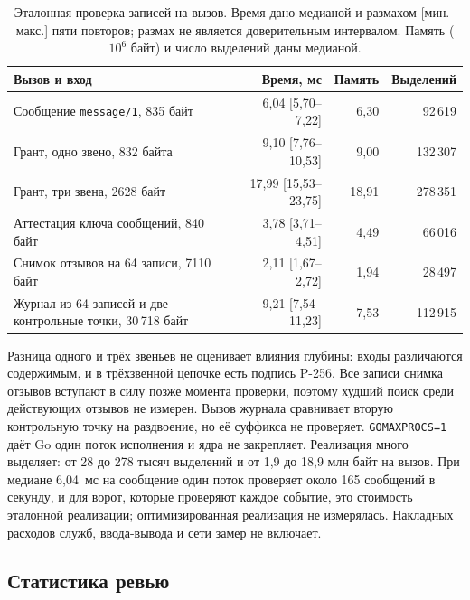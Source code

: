 \documentclass[10pt,a4paper]{article}
\begin{document}
\begin{table}[t]
\centering\small
\caption{Эталонная проверка записей на вызов. Время дано медианой и размахом [мин.--макс.] пяти повторов; размах не является доверительным интервалом. Память ($10^6$ байт) и число выделений даны медианой.}
\label{tab:bench}
\begin{tabular}{L{7.6cm}rrr}
\toprule
Вызов и вход & Время, мс & Память & Выделений \\
\midrule
Сообщение \texttt{message/1}, 835 байт & 6,04 [5,70--7,22] & 6,30 & 92\,619 \\
Грант, одно звено, 832 байта & 9,10 [7,76--10,53] & 9,00 & 132\,307 \\
Грант, три звена, 2628 байт & 17,99 [15,53--23,75] & 18,91 & 278\,351 \\
Аттестация ключа сообщений, 840 байт & 3,78 [3,71--4,51] & 4,49 & 66\,016 \\
Снимок отзывов на 64 записи, 7110 байт & 2,11 [1,67--2,72] & 1,94 & 28\,497 \\
Журнал из 64 записей и две контрольные точки, 30\,718 байт & 9,21 [7,54--11,23] & 7,53 & 112\,915 \\
\bottomrule
\end{tabular}
\end{table}

Разница одного и трёх звеньев не оценивает влияния глубины: входы различаются содержимым, и в трёхзвенной цепочке есть подпись P-256. Все записи снимка отзывов вступают в силу позже момента проверки, поэтому худший поиск среди действующих отзывов не измерен. Вызов журнала сравнивает вторую контрольную точку на раздвоение, но её суффикса не проверяет. \texttt{GOMAXPROCS=1} даёт Go один поток исполнения и ядра не закрепляет. Реализация много выделяет: от 28 до 278 тысяч выделений и от 1,9 до 18,9 млн байт на вызов. При медиане 6,04~мс на сообщение один поток проверяет около 165 сообщений в секунду, и для ворот, которые проверяют каждое событие, это стоимость эталонной реализации; оптимизированная реализация не измерялась. Накладных расходов служб, ввода-вывода и сети замер не включает.

\subsection{Статистика ревью}
\end{document}
